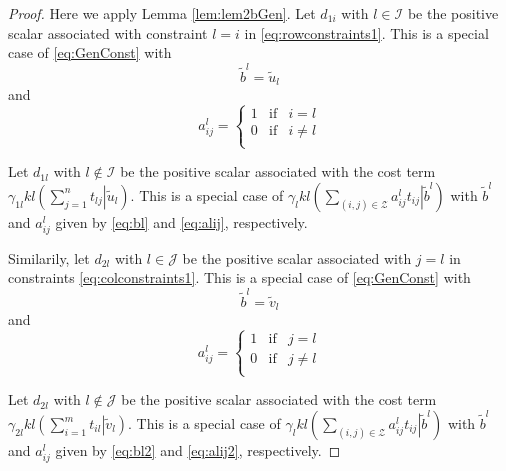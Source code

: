 \documentclass[10pt,a4paper]{amsart}
\begin{document}
 \begin{proof}  
 
Here we apply  Lemma \ref{lem:lem2bGen}.
Let $d_{1i}$ with $l\in \mathcal{I}$ 
be the positive scalar associated with   constraint $l=i$ in \eqref{eq:rowconstraints1}.
This is a special case of \eqref{eq:GenConst} with
\begin{equation}
\label{eq:bl}
\tilde{b}^l = \tilde{u}_l
\end{equation}
and
\begin{equation}
\label{eq:alij}
a^l_{ij} = \left\{ \begin{array}{rcl}
1 &\text{if} & i=l  \\
0 &\text{if} & i \neq l  \\
\end{array} \right.
\end{equation}

Let $d_{1l}$ with $l \notin \mathcal{I}$ 
be the positive scalar associated with the cost term
$\gamma_{1l} kl\left(\left. \sum_{j=1}^n  t_{lj} \right| \tilde{u}_l\right)$.
This is a special case of 
$\gamma_l kl\left( \sum_{(i,j) \in {\mathcal Z}} 
\left. a^l_{ij} t_{ij}\right|\tilde{b}^l  \right)$
with
$\tilde{b}^l$ and $a^l_{ij}$ given by \eqref{eq:bl} and \eqref{eq:alij}, respectively.

Similarily, let  $d_{2l}$ with $l\in \mathcal{J}$ 
be  the positive scalar associated with $j=l$ in constraints  \eqref{eq:colconstraints1}.
This is a special case of \eqref{eq:GenConst} with
\begin{equation}
\label{eq:bl2}
\tilde{b}^l = \tilde{v}_l
\end{equation}
and
\begin{equation}
\label{eq:alij2}
a^l_{ij} = \left\{ \begin{array}{rcl}
1 &\text{if} & j=l  \\
0 &\text{if} & j \neq l  \\
\end{array} \right.
\end{equation}



Let $d_{2l}$ with $l\notin \mathcal{J}$ 
be the positive scalar associated with the cost term
$\gamma_{2l} kl\left(\left. \sum_{i=1}^m  t_{il} \right| \tilde{v}_l\right)$.
This is a special case of 
$\gamma_l kl\left( \sum_{(i,j) \in {\mathcal Z}} 
\left. a^l_{ij} t_{ij}\right|\tilde{b}^l  \right)$
with
$\tilde{b}^l$ and $a^l_{ij}$ given by \eqref{eq:bl2} and \eqref{eq:alij2}, respectively.


\end{proof}
\end{document}
